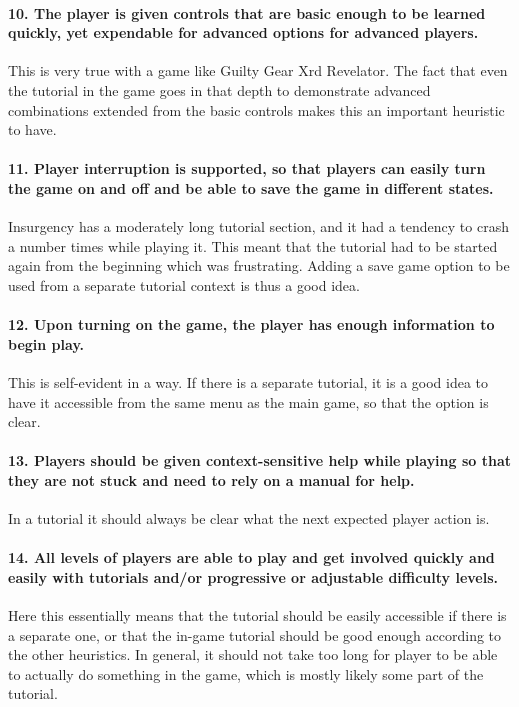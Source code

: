 \paragraph{10. The player is given controls that are basic enough to be learned quickly, yet expendable for advanced options for advanced players.} This is very true with a game like Guilty Gear Xrd Revelator. The fact that even the tutorial in the game goes in that depth to demonstrate advanced combinations extended from the basic controls makes this an important heuristic to have.

\paragraph{11. Player interruption is supported, so that players can easily turn the game on and off and be able to save the game in different states.} Insurgency has a moderately long tutorial section, and it had a tendency to crash a number times while playing it. This meant that the tutorial had to be started again from the beginning which was frustrating. Adding a save game option to be used from a separate tutorial context is thus a good idea.

\paragraph{12. Upon turning on the game, the player has enough information to begin play.} This is self-evident in a way. If there is a separate tutorial, it is a good idea to have it accessible from the same menu as the main game, so that the option is clear.

\paragraph{13. Players should be given context-sensitive help while playing so that they are not stuck and need to rely on a manual for help.} 
In a tutorial it should always be clear what the next expected player action is.

\paragraph{14. All levels of players are able to play and get involved quickly and easily with tutorials and/or progressive or adjustable difficulty levels. }
Here this essentially means that the tutorial should be easily accessible if there is a separate one, or that the in-game tutorial should be good enough according to the other heuristics. In general, it should not take too long for player to be able to actually do something in the game, which is mostly likely some part of the tutorial.
 
